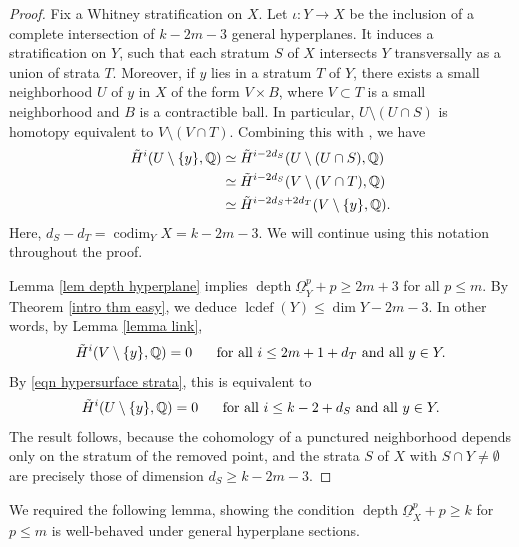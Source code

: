 \documentclass[11pt]{amsart}
\theoremstyle{definition}
\theoremstyle{plain}
\newcounter{intro}
\DeclareMathOperator{\lcdef}{lcdef}
\DeclareMathOperator{\depth}{depth}
\DeclareMathOperator{\codim}{codim}
\begin{document}
\begin{proof}
Fix a Whitney stratification on $X$. Let $\iota: Y \rightarrow X$ be the inclusion of a complete intersection of $k-2m-3$ general hyperplanes. It induces a stratification on $Y$, such that each stratum $S$ of $X$ intersects $Y$ transversally as a union of strata $T$. Moreover, if $y$ lies in a stratum $T$ of $Y$, there exists a small neighborhood $U$ of $y$ in $X$ of the form $V \times B$, where $V \subset T$ is a small neighborhood and $B$ is a contractible ball. In particular, $U \setminus (U \cap S)$ is homotopy equivalent to $V \setminus (V \cap T)$. Combining this with \cite[Lemma $15.10$]{popa park lefschetz}, we have
\begin{align}\label{eqn hypersurface strata}
    \Tilde{H}^i(U \setminus \{ y \}, \mathbb{Q}) &\simeq \Tilde{H}^{i-2d_S}(U \setminus (U \cap S), \mathbb{Q}) \\ &\simeq \Tilde{H}^{i-2d_S}(V \setminus (V \cap T), \mathbb{Q}) \notag\\
    &\simeq \Tilde{H}^{i-2d_S+2d_T}(V \setminus \{ y \}, \mathbb{Q}) \notag.
\end{align}
Here, $d_S - d_T = \codim_Y X = k-2m-3$. We will continue using this notation throughout the proof.

Lemma \ref{lem depth hyperplane} implies $\depth \underline{\Omega}_Y^p + p \geq 2m+3$ for all $p \leq m$. By Theorem \ref{intro thm easy}, we deduce $\lcdef(Y) \leq \dim Y-2m-3$. In other words, by Lemma \ref{lemma link},
\begin{align*}
    \Tilde{H}^i(V \setminus \{ y \}, \mathbb{Q}) = 0 \hspace{.5cm} \text{ for all } i \leq 2m+1+d_T \text{ and all } y \in Y.
\end{align*}
By \ref{eqn hypersurface strata}, this is equivalent to
\begin{align*}
    \Tilde{H}^i(U \setminus \{ y \}, \mathbb{Q}) = 0 \hspace{.5cm} \text{ for all } i \leq k-2 + d_S \text{ and all } y \in Y.
\end{align*}
The result follows, because the cohomology of a punctured neighborhood depends only on the stratum of the removed point, and the strata $S$ of $X$ with $S \cap Y \neq \emptyset$ are precisely those of dimension $d_S \geq k-2m-3$.
\end{proof}

We required the following lemma, showing the condition $\depth \underline{\Omega}_X^p + p \geq k$ for $p \leq m$ is well-behaved under general hyperplane sections.
\end{document}
